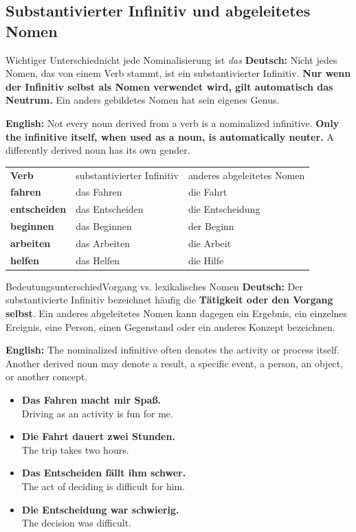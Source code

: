 \documentclass[a4paper,11pt]{article}
\newcommand{\GermanText}[1]{\textbf{Deutsch: }#1\par}
\newcommand{\EnglishText}[1]{{\small\color{SoftGray}\textbf{English: }#1\par}}
\newcommand{\ExampleItem}[2]{\item \textbf{#1}\\{\small\color{SoftGray}#2}}
\begin{document}
\begin{preview}
\section{Substantivierter Infinitiv und abgeleitetes Nomen}
\begin{grammarentry}{Wichtiger Unterschied}{nicht jede Nominalisierung ist \textit{das}}
\GermanText{Nicht jedes Nomen, das von einem Verb stammt, ist ein substantivierter Infinitiv. \textbf{Nur wenn der Infinitiv selbst als Nomen verwendet wird, gilt automatisch das Neutrum.} Ein anders gebildetes Nomen hat sein eigenes Genus.}
\EnglishText{Not every noun derived from a verb is a nominalized infinitive. \textbf{Only the infinitive itself, when used as a noun, is automatically neuter.} A differently derived noun has its own gender.}
\end{grammarentry}
\begin{longtable}{>{\bfseries}p{3cm}|p{5cm}|p{5cm}}
\rowcolor{HeaderBlueDark}\color{white}Verb & \color{white}substantivierter Infinitiv & \color{white}anderes abgeleitetes Nomen \\
fahren & das Fahren & die Fahrt \\
entscheiden & das Entscheiden & die Entscheidung \\
beginnen & das Beginnen & der Beginn \\
arbeiten & das Arbeiten & die Arbeit \\
helfen & das Helfen & die Hilfe \
\end{longtable}
\begin{grammarentry}{Bedeutungsunterschied}{Vorgang vs. lexikalisches Nomen}
\GermanText{Der substantivierte Infinitiv bezeichnet häufig die \textbf{Tätigkeit oder den Vorgang selbst}. Ein anderes abgeleitetes Nomen kann dagegen ein Ergebnis, ein einzelnes Ereignis, eine Person, einen Gegenstand oder ein anderes Konzept bezeichnen.}
\EnglishText{The nominalized infinitive often denotes the activity or process itself. Another derived noun may denote a result, a specific event, a person, an object, or another concept.}
\end{grammarentry}
\begin{exbox}\begin{itemize}
\ExampleItem{Das Fahren macht mir Spaß.}{Driving as an activity is fun for me.}
\ExampleItem{Die Fahrt dauert zwei Stunden.}{The trip takes two hours.}
\ExampleItem{Das Entscheiden fällt ihm schwer.}{The act of deciding is difficult for him.}
\ExampleItem{Die Entscheidung war schwierig.}{The decision was difficult.}
\end{itemize}\end{exbox}


\end{preview}
\end{document}
